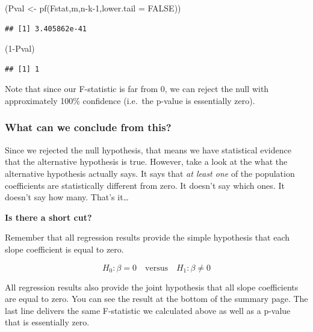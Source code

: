 \documentclass[
]{book}
\newenvironment{Shaded}{\begin{snugshade}}{\end{snugshade}}
\newcommand{\AttributeTok}[1]{\textcolor[rgb]{0.77,0.63,0.00}{#1}}
\newcommand{\ConstantTok}[1]{\textcolor[rgb]{0.00,0.00,0.00}{#1}}
\newcommand{\DecValTok}[1]{\textcolor[rgb]{0.00,0.00,0.81}{#1}}
\newcommand{\FunctionTok}[1]{\textcolor[rgb]{0.00,0.00,0.00}{#1}}
\newcommand{\NormalTok}[1]{#1}
\newcommand{\OtherTok}[1]{\textcolor[rgb]{0.56,0.35,0.01}{#1}}
\newcommand{\SpecialCharTok}[1]{\textcolor[rgb]{0.00,0.00,0.00}{#1}}
\begin{document}
\begin{Shaded}
\begin{Highlighting}[]
\NormalTok{(Pval }\OtherTok{\textless{}{-}} \FunctionTok{pf}\NormalTok{(Fstat,m,n}\SpecialCharTok{{-}}\NormalTok{k}\DecValTok{{-}1}\NormalTok{,}\AttributeTok{lower.tail =} \ConstantTok{FALSE}\NormalTok{))}
\end{Highlighting}
\end{Shaded}

\begin{verbatim}
## [1] 3.405862e-41
\end{verbatim}

\begin{Shaded}
\begin{Highlighting}[]
\NormalTok{(}\DecValTok{1}\SpecialCharTok{{-}}\NormalTok{Pval)}
\end{Highlighting}
\end{Shaded}

\begin{verbatim}
## [1] 1
\end{verbatim}

Note that since our F-statistic is far from 0, we can reject the null with approximately 100\% confidence (i.e.~the p-value is essentially zero).

\hypertarget{what-can-we-conclude-from-this}{%
\subsubsection*{What can we conclude from this?}\label{what-can-we-conclude-from-this}}

Since we rejected the null hypothesis, that means we have statistical evidence that the alternative hypothesis is true. However, take a look at the what the alternative hypothesis actually says. It says that \emph{at least one} of the population coefficients are statistically different from zero. It doesn't say which ones. It doesn't say how many. That's it\ldots{}

\textbf{Is there a short cut?}

Remember that all regression results provide the simple hypothesis that each slope coefficient is equal to zero.

\[H_0: \beta=0 \quad \text{versus} \quad H_1: \beta \neq 0\]

All regression results also provide the joint hypothesis that all slope coefficients are equal to zero. You can see the result at the bottom of the summary page. The last line delivers the same F-statistic we calculated above as well as a p-value that is essentially zero.
\end{document}
